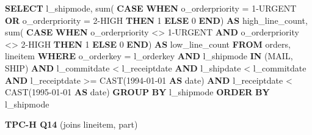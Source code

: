 \documentclass[
  10pt,
]{article}
\newenvironment{Shaded}{}{}
\newcommand{\ControlFlowTok}[1]{\textcolor[rgb]{0.00,0.44,0.13}{\textbf{#1}}}
\newcommand{\DataTypeTok}[1]{\textcolor[rgb]{0.56,0.13,0.00}{#1}}
\newcommand{\DecValTok}[1]{\textcolor[rgb]{0.25,0.63,0.44}{#1}}
\newcommand{\FunctionTok}[1]{\textcolor[rgb]{0.02,0.16,0.49}{#1}}
\newcommand{\KeywordTok}[1]{\textcolor[rgb]{0.00,0.44,0.13}{\textbf{#1}}}
\newcommand{\NormalTok}[1]{#1}
\newcommand{\OperatorTok}[1]{\textcolor[rgb]{0.40,0.40,0.40}{#1}}
\newcommand{\StringTok}[1]{\textcolor[rgb]{0.25,0.44,0.63}{#1}}
\begin{document}
\begin{Shaded}
\begin{Highlighting}[]
\KeywordTok{SELECT}
\NormalTok{    l\_shipmode,}
    \FunctionTok{sum}\NormalTok{(}
        \ControlFlowTok{CASE} \ControlFlowTok{WHEN}\NormalTok{ o\_orderpriority }\OperatorTok{=} \StringTok{\textquotesingle{}1{-}URGENT\textquotesingle{}}
            \KeywordTok{OR}\NormalTok{ o\_orderpriority }\OperatorTok{=} \StringTok{\textquotesingle{}2{-}HIGH\textquotesingle{}} \ControlFlowTok{THEN}
            \DecValTok{1}
        \ControlFlowTok{ELSE}
            \DecValTok{0}
        \ControlFlowTok{END}\NormalTok{) }\KeywordTok{AS}\NormalTok{ high\_line\_count,}
    \FunctionTok{sum}\NormalTok{(}
        \ControlFlowTok{CASE} \ControlFlowTok{WHEN}\NormalTok{ o\_orderpriority }\OperatorTok{\textless{}\textgreater{}} \StringTok{\textquotesingle{}1{-}URGENT\textquotesingle{}}
            \KeywordTok{AND}\NormalTok{ o\_orderpriority }\OperatorTok{\textless{}\textgreater{}} \StringTok{\textquotesingle{}2{-}HIGH\textquotesingle{}} \ControlFlowTok{THEN}
            \DecValTok{1}
        \ControlFlowTok{ELSE}
            \DecValTok{0}
        \ControlFlowTok{END}\NormalTok{) }\KeywordTok{AS}\NormalTok{ low\_line\_count}
\KeywordTok{FROM}
\NormalTok{    orders,}
\NormalTok{    lineitem}
\KeywordTok{WHERE}
\NormalTok{    o\_orderkey }\OperatorTok{=}\NormalTok{ l\_orderkey}
    \KeywordTok{AND}\NormalTok{ l\_shipmode }\KeywordTok{IN}\NormalTok{ (}\StringTok{\textquotesingle{}MAIL\textquotesingle{}}\NormalTok{, }\StringTok{\textquotesingle{}SHIP\textquotesingle{}}\NormalTok{)}
    \KeywordTok{AND}\NormalTok{ l\_commitdate }\OperatorTok{\textless{}}\NormalTok{ l\_receiptdate}
    \KeywordTok{AND}\NormalTok{ l\_shipdate }\OperatorTok{\textless{}}\NormalTok{ l\_commitdate}
    \KeywordTok{AND}\NormalTok{ l\_receiptdate }\OperatorTok{\textgreater{}=} \FunctionTok{CAST}\NormalTok{(}\StringTok{\textquotesingle{}1994{-}01{-}01\textquotesingle{}} \KeywordTok{AS} \DataTypeTok{date}\NormalTok{)}
    \KeywordTok{AND}\NormalTok{ l\_receiptdate }\OperatorTok{\textless{}} \FunctionTok{CAST}\NormalTok{(}\StringTok{\textquotesingle{}1995{-}01{-}01\textquotesingle{}} \KeywordTok{AS} \DataTypeTok{date}\NormalTok{)}
\KeywordTok{GROUP} \KeywordTok{BY}
\NormalTok{    l\_shipmode}
\KeywordTok{ORDER} \KeywordTok{BY}
\NormalTok{    l\_shipmode}
\end{Highlighting}
\end{Shaded}

\textbf{TPC-H Q14} (joins lineitem, part)
\end{document}
